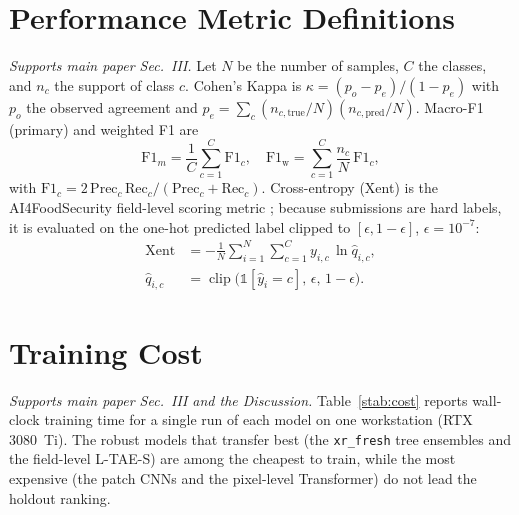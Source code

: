 \documentclass[journal]{IEEEtran}
\begin{document}
\section{Performance Metric Definitions}
\label{sec:metrics}
\emph{Supports main paper Sec.~III.}
Let $N$ be the number of samples, $C$ the classes, and $n_c$ the support of class $c$. Cohen's Kappa
is $\kappa = (p_o - p_e)/(1 - p_e)$ with $p_o$ the observed agreement and
$p_e=\sum_c (n_{c,\text{true}}/N)(n_{c,\text{pred}}/N)$. Macro-F1 (primary) and weighted F1 are
\begin{equation}
\mathrm{F1}_{m} = \frac{1}{C}\sum_{c=1}^{C}\mathrm{F1}_c,
\quad
\mathrm{F1}_{\text{w}} = \sum_{c=1}^{C}\frac{n_c}{N}\,\mathrm{F1}_c,
\end{equation}
with $\mathrm{F1}_c = 2\,\mathrm{Prec}_c\,\mathrm{Rec}_c/(\mathrm{Prec}_c+\mathrm{Rec}_c)$.
Cross-entropy (Xent) is the AI4FoodSecurity field-level scoring metric \cite{ai4foodsecurity};
because submissions are hard labels, it is evaluated on the one-hot predicted label clipped to
$[\epsilon,1-\epsilon]$, $\epsilon=10^{-7}$:
\begin{equation}
\begin{aligned}
\mathrm{Xent} &= -\frac{1}{N}\sum_{i=1}^N \sum_{c=1}^{C} y_{i,c}\,\ln\hat{q}_{i,c},\\
\hat{q}_{i,c} &= \operatorname{clip}\!\big(\mathbb{1}[\hat{y}_i = c],\,\epsilon,\,1-\epsilon\big).
\end{aligned}
\end{equation}

\section{Training Cost}
\label{sec:cost}
\emph{Supports main paper Sec.~III and the Discussion.}
Table~\ref{stab:cost} reports wall-clock training time for a single run of each model on one
workstation (RTX 3080~Ti). The robust models that transfer best (the \texttt{xr\_fresh} tree
ensembles and the field-level L-TAE-S) are among the cheapest to train, while the most expensive
(the patch CNNs and the pixel-level Transformer) do not lead the holdout ranking.
\end{document}
